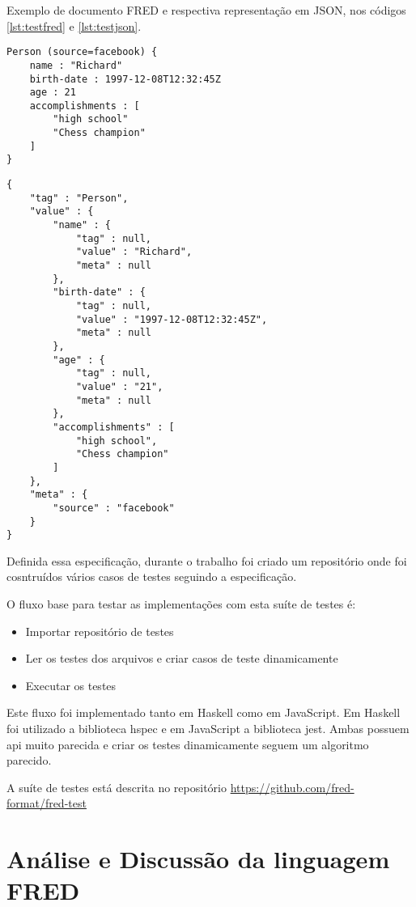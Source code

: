 Exemplo de documento FRED e respectiva representação em JSON, nos códigos \ref{lst:testfred}
e \ref{lst:testjson}.

\begin{lstlisting}[caption=Exemplo de FRED ,label={lst:testfred}]
Person (source=facebook) {
    name : "Richard"
    birth-date : 1997-12-08T12:32:45Z
    age : 21
    accomplishments : [
        "high school"
        "Chess champion"
    ]
}
\end{lstlisting}


\begin{lstlisting}[caption=Exemplo de JSON no formato de testes ,label={lst:testjson}]
{
    "tag" : "Person",
    "value" : {
        "name" : {
            "tag" : null,
            "value" : "Richard", 
            "meta" : null
        },
        "birth-date" : {
            "tag" : null,
            "value" : "1997-12-08T12:32:45Z", 
            "meta" : null
        },
        "age" : {
            "tag" : null,
            "value" : "21", 
            "meta" : null
        },
        "accomplishments" : [
            "high school",
            "Chess champion"
        ]
    },
    "meta" : {
        "source" : "facebook"
    }
}
\end{lstlisting}
    
Definida essa especificação, durante o trabalho foi criado um repositório onde foi
cosntruídos vários casos de testes seguindo a especificação.

O fluxo base para testar as implementações com esta suíte de testes é:

\begin{itemize}
    \item Importar repositório de testes
    \item Ler os testes dos arquivos e criar casos de teste dinamicamente
    \item Executar os testes
\end{itemize}

Este fluxo foi implementado tanto em Haskell como em JavaScript. 
Em Haskell foi utilizado a biblioteca hspec e em JavaScript a biblioteca jest.
Ambas possuem api muito parecida e criar os testes dinamicamente seguem um algoritmo
parecido.

A suíte de testes está descrita no 
repositório \url{https://github.com/fred-format/fred-test}

\section{Análise e Discussão da linguagem FRED}

